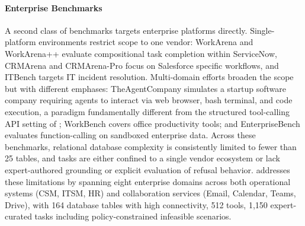\paragraph{Enterprise Benchmarks}
A second class of benchmarks targets enterprise platforms directly. Single-platform environments restrict scope to one vendor: WorkArena \citep{workarena2024} and WorkArena++ \citep{boisvert2024workarenacompositionalplanningreasoningbased} evaluate compositional task completion within ServiceNow, CRMArena \citep{huang-etal-2025-crmarena} and CRMArena-Pro \citep{huang-etal-2025-crmarena-pro} focus on Salesforce specific workflows, and ITBench \citep{jha2025itbenchevaluatingaiagents} targets IT incident resolution. Multi-domain efforts broaden the scope but with different emphases: TheAgentCompany \citep{xu2024theagentcompanybenchmarkingllmagents} simulates a startup software company requiring agents to interact via web browser, bash terminal, and code execution, a paradigm fundamentally different from the structured tool-calling API setting of \ours{}; WorkBench \citep{styles2024workbenchbenchmarkdatasetagents} covers office productivity tools; and EnterpriseBench \citep{vishwakarma2025llmshelpworksandbox} evaluates function-calling on sandboxed enterprise data. Across these benchmarks, relational database complexity is consistently limited to fewer than 25 tables, and tasks are either confined to a single vendor ecosystem or lack expert-authored grounding or explicit evaluation of refusal behavior. \ours{} addresses these limitations by spanning eight enterprise domains across both operational systems (CSM, ITSM, HR) and collaboration services (Email, Calendar, Teams, Drive), with 164 database tables with high connectivity, 512 tools, 1,150 expert-curated tasks including policy-constrained infeasible scenarios.

